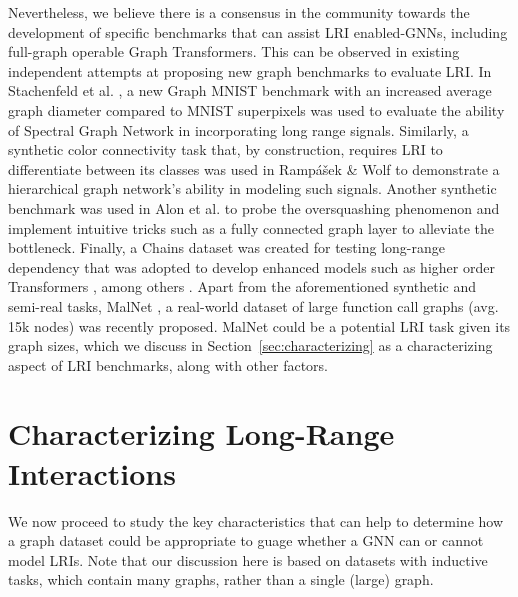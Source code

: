 \documentclass{article}
\begin{document}
Nevertheless, we believe there is a consensus in the community towards the development of specific benchmarks that can assist 
LRI enabled-GNNs, including full-graph operable Graph Transformers. This can be observed in existing independent attempts at proposing new graph benchmarks to evaluate LRI. In Stachenfeld et al. \cite{stachenfeld2020graph}, a new Graph MNIST benchmark with an increased average graph diameter compared to MNIST superpixels \cite{defferrard2016convolutional, dwivedi2020benchmarking} was used to evaluate the ability of Spectral Graph Network in incorporating long range signals. Similarly, a synthetic color connectivity task that, by construction, requires LRI to differentiate between its classes was used in Rampášek \& Wolf \cite{rampavsek2021hierarchical} to demonstrate a hierarchical graph network's ability in modeling such signals. Another synthetic benchmark was used in Alon et al. \cite{alon2020bottleneck} to probe the oversquashing phenomenon and implement intuitive tricks such as a fully connected graph layer to alleviate the bottleneck. 
Finally, a Chains dataset \cite{gu2020implicit} was created for testing long-range dependency that was adopted to develop enhanced models such as higher order Transformers \cite{kim2021transformers}, among others \cite{yang2021graph, liu2022mgnni}.
Apart from the aforementioned synthetic and semi-real tasks, MalNet \cite{freitas2020large}, a real-world dataset of large function call graphs (avg. 15k nodes) was recently proposed. MalNet could be a potential LRI task given its graph sizes, which we discuss in Section~\ref{sec:characterizing} as a characterizing aspect of LRI benchmarks, along with other factors.



\section{Characterizing Long-Range Interactions}
\vspace{-3pt}
\label{sec:characterizing}
We now proceed to study the key characteristics that can help to determine how a graph dataset could be appropriate to guage whether a GNN can or cannot model LRIs. Note that our discussion here is based on datasets with inductive tasks, which contain many graphs, rather than a single (large) graph.
\end{document}
